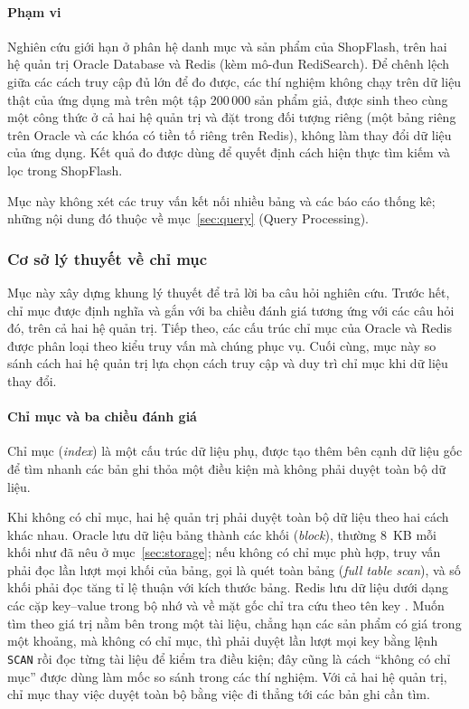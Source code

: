 \paragraph*{Phạm vi}

Nghiên cứu giới hạn ở phân hệ danh mục và sản phẩm của ShopFlash, trên hai hệ quản trị Oracle Database và Redis (kèm mô-đun RediSearch). Để chênh lệch giữa các cách truy cập đủ lớn để đo được, các thí nghiệm không chạy trên dữ liệu thật của ứng dụng mà trên một tập 200\,000 sản phẩm giả, được sinh theo cùng một công thức ở cả hai hệ quản trị và đặt trong đối tượng riêng (một bảng riêng trên Oracle và các khóa có tiền tố riêng trên Redis), không làm thay đổi dữ liệu của ứng dụng. Kết quả đo được dùng để quyết định cách hiện thực tìm kiếm và lọc trong ShopFlash.

Mục này không xét các truy vấn kết nối nhiều bảng và các báo cáo thống kê; những nội dung đó thuộc về mục~\ref{sec:query} (Query Processing).

\subsubsection{Cơ sở lý thuyết về chỉ mục}\label{sec:ix-theory}

Mục này xây dựng khung lý thuyết để trả lời ba câu hỏi nghiên cứu. Trước hết, chỉ mục được định nghĩa và gắn với ba chiều đánh giá tương ứng với các câu hỏi đó, trên cả hai hệ quản trị. Tiếp theo, các cấu trúc chỉ mục của Oracle và Redis được phân loại theo kiểu truy vấn mà chúng phục vụ. Cuối cùng, mục này so sánh cách hai hệ quản trị lựa chọn cách truy cập và duy trì chỉ mục khi dữ liệu thay đổi.

\paragraph{Chỉ mục và ba chiều đánh giá}\label{sec:ix-dimensions}

Chỉ mục (\emph{index}) là một cấu trúc dữ liệu phụ, được tạo thêm bên cạnh dữ liệu gốc để tìm nhanh các bản ghi thỏa một điều kiện mà không phải duyệt toàn bộ dữ liệu. 

Khi không có chỉ mục, hai hệ quản trị phải duyệt toàn bộ dữ liệu theo hai cách khác nhau. Oracle lưu dữ liệu bảng thành các khối (\emph{block}), thường 8~KB mỗi khối như đã nêu ở mục~\ref{sec:storage}; nếu không có chỉ mục phù hợp, truy vấn phải đọc lần lượt mọi khối của bảng, gọi là quét toàn bảng (\emph{full table scan}), và số khối phải đọc tăng tỉ lệ thuận với kích thước bảng. Redis lưu dữ liệu dưới dạng các cặp key--value trong bộ nhớ và về mặt gốc chỉ tra cứu theo tên key \cite{redisSecondaryIndexing}. Muốn tìm theo giá trị nằm bên trong một tài liệu, chẳng hạn các sản phẩm có giá trong một khoảng, mà không có chỉ mục, thì phải duyệt lần lượt mọi key bằng lệnh \texttt{SCAN} rồi đọc từng tài liệu để kiểm tra điều kiện; đây cũng là cách ``không có chỉ mục'' được dùng làm mốc so sánh trong các thí nghiệm. Với cả hai hệ quản trị, chỉ mục thay việc duyệt toàn bộ bằng việc đi thẳng tới các bản ghi cần tìm.

